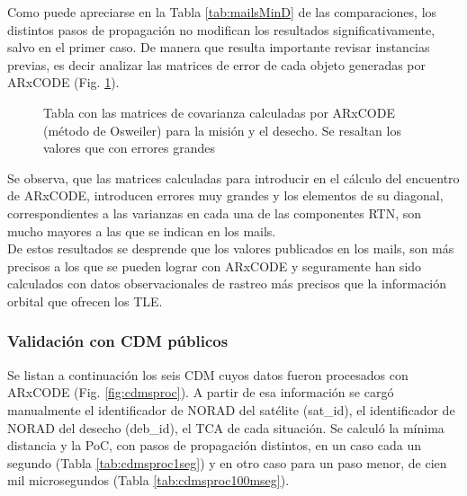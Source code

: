 Como puede apreciarse en la Tabla \ref{tab:mailsMinD} de las comparaciones, los distintos pasos de propagaci\'on no modifican los resultados significativamente, salvo en el primer caso. De manera que resulta importante revisar instancias previas, es decir analizar las matrices de error de cada objeto generadas por ARxCODE (Fig. \ref{fig:tablaMAmails}).\\

 \begin{figure}[!h]
  \centering
  \caption{Tabla con las matrices de covarianza calculadas por ARxCODE (m\'etodo de Osweiler) para la misi\'on y el desecho. Se resaltan los valores que con errores grandes}
  \label{fig:tablaMAmails}
\end{figure}

Se observa, que las matrices calculadas para introducir en el c\'alculo del encuentro de ARxCODE, introducen errores muy grandes y los elementos de su diagonal, correspondientes a las varianzas en cada una de las componentes RTN, son mucho mayores a las que se indican en los mails.\\

De estos resultados se desprende que los valores publicados en los mails, son m\'as precisos a los que se pueden lograr con ARxCODE y seguramente han sido calculados con datos observacionales de rastreo m\'as precisos que la informaci\'on orbital que ofrecen los TLE. 

\subsubsection*{Validaci\'on con CDM p\'ublicos}

Se listan a continuaci\'on los seis CDM cuyos datos fueron procesados con ARxCODE (Fig. \ref{fig:cdmsproc}). A partir de esa informaci\'on se carg\'o manualmente el identificador de NORAD del sat\'elite (sat\_id), el identificador de NORAD del desecho (deb\_id), el TCA de cada situaci\'on. Se calcul\'o la m\'inima distancia y la PoC, con pasos de propagaci\'on distintos, en un caso cada un segundo (Tabla \ref{tab:cdmsproc1seg}) y en otro caso para un paso menor, de cien mil microsegundos (Tabla \ref{tab:cdmsproc100mseg}).\\
 
